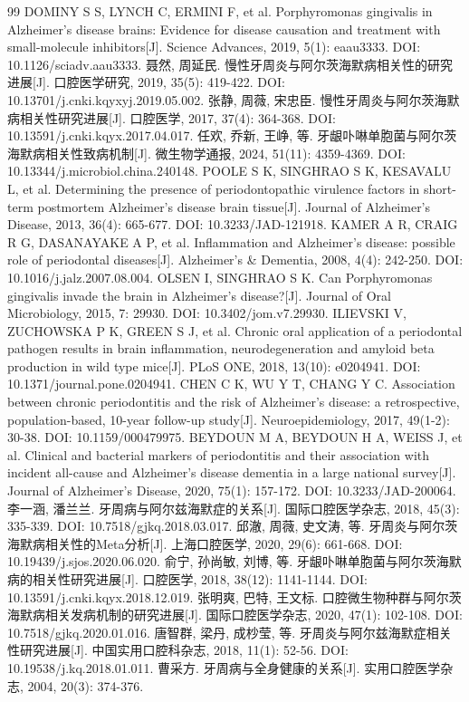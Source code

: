 \documentclass[12pt,a4paper]{ctexart}
\begin{document}
\begin{thebibliography}{99}
 DOMINY S S, LYNCH C, ERMINI F, et al. Porphyromonas gingivalis in Alzheimer's disease brains: Evidence for disease causation and treatment with small-molecule inhibitors[J]. Science Advances, 2019, 5(1): eaau3333. DOI: 10.1126/sciadv.aau3333.
 聂然, 周延民. 慢性牙周炎与阿尔茨海默病相关性的研究进展[J]. 口腔医学研究, 2019, 35(5): 419-422. DOI: 10.13701/j.cnki.kqyxyj.2019.05.002.
 张静, 周薇, 宋忠臣. 慢性牙周炎与阿尔茨海默病相关性研究进展[J]. 口腔医学, 2017, 37(4): 364-368. DOI: 10.13591/j.cnki.kqyx.2017.04.017.
 任欢, 乔新, 王峥, 等. 牙龈卟啉单胞菌与阿尔茨海默病相关性致病机制[J]. 微生物学通报, 2024, 51(11): 4359-4369. DOI: 10.13344/j.microbiol.china.240148.
 POOLE S K, SINGHRAO S K, KESAVALU L, et al. Determining the presence of periodontopathic virulence factors in short-term postmortem Alzheimer's disease brain tissue[J]. Journal of Alzheimer's Disease, 2013, 36(4): 665-677. DOI: 10.3233/JAD-121918.
 KAMER A R, CRAIG R G, DASANAYAKE A P, et al. Inflammation and Alzheimer's disease: possible role of periodontal diseases[J]. Alzheimer's \& Dementia, 2008, 4(4): 242-250. DOI: 10.1016/j.jalz.2007.08.004.
 OLSEN I, SINGHRAO S K. Can Porphyromonas gingivalis invade the brain in Alzheimer's disease?[J]. Journal of Oral Microbiology, 2015, 7: 29930. DOI: 10.3402/jom.v7.29930.
 ILIEVSKI V, ZUCHOWSKA P K, GREEN S J, et al. Chronic oral application of a periodontal pathogen results in brain inflammation, neurodegeneration and amyloid beta production in wild type mice[J]. PLoS ONE, 2018, 13(10): e0204941. DOI: 10.1371/journal.pone.0204941.
 CHEN C K, WU Y T, CHANG Y C. Association between chronic periodontitis and the risk of Alzheimer's disease: a retrospective, population-based, 10-year follow-up study[J]. Neuroepidemiology, 2017, 49(1-2): 30-38. DOI: 10.1159/000479975.
 BEYDOUN M A, BEYDOUN H A, WEISS J, et al. Clinical and bacterial markers of periodontitis and their association with incident all-cause and Alzheimer's disease dementia in a large national survey[J]. Journal of Alzheimer's Disease, 2020, 75(1): 157-172. DOI: 10.3233/JAD-200064.
 李一涵, 潘兰兰. 牙周病与阿尔兹海默症的关系[J]. 国际口腔医学杂志, 2018, 45(3): 335-339. DOI: 10.7518/gjkq.2018.03.017.
 邱澈, 周薇, 史文涛, 等. 牙周炎与阿尔茨海默病相关性的Meta分析[J]. 上海口腔医学, 2020, 29(6): 661-668. DOI: 10.19439/j.sjos.2020.06.020.
 俞宁, 孙尚敏, 刘博, 等. 牙龈卟啉单胞菌与阿尔茨海默病的相关性研究进展[J]. 口腔医学, 2018, 38(12): 1141-1144. DOI: 10.13591/j.cnki.kqyx.2018.12.019.
 张明爽, 巴特, 王文标. 口腔微生物种群与阿尔茨海默病相关发病机制的研究进展[J]. 国际口腔医学杂志, 2020, 47(1): 102-108. DOI: 10.7518/gjkq.2020.01.016.
 唐智群, 梁丹, 成杪莹, 等. 牙周炎与阿尔兹海默症相关性研究进展[J]. 中国实用口腔科杂志, 2018, 11(1): 52-56. DOI: 10.19538/j.kq.2018.01.011.
 曹采方. 牙周病与全身健康的关系[J]. 实用口腔医学杂志, 2004, 20(3): 374-376.
\end{thebibliography}
\end{document}

